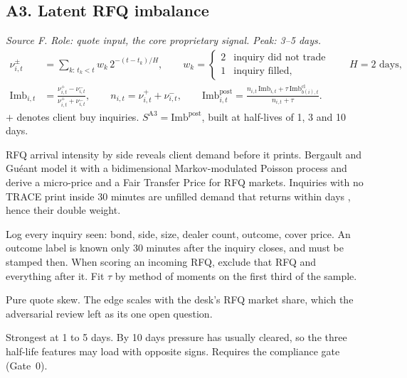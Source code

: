 \documentclass[11pt,letterpaper]{article}
\newcommand{\Imb}{\mathrm{Imb}}
\begin{document}
\subsection{A3. Latent RFQ imbalance}
\emph{Source F. Role: quote input, the core proprietary signal. Peak: 3--5 days.}
\begin{align}
\nu^{\pm}_{i,t} &= \sum_{k:\,t_k<t} w_k\,2^{-(t-t_k)/H},\qquad w_k=\begin{cases}2 & \text{inquiry did not trade}\\ 1 & \text{inquiry filled,}\end{cases}\qquad H=2\text{ days},\\
\Imb_{i,t} &= \frac{\nu^{+}_{i,t}-\nu^{-}_{i,t}}{\nu^{+}_{i,t}+\nu^{-}_{i,t}},\qquad n_{i,t}=\nu^{+}_{i,t}+\nu^{-}_{i,t},\qquad
\Imb^{\mathrm{post}}_{i,t}=\frac{n_{i,t}\,\Imb_{i,t}+\tau\,\Imb^{\mathrm{cl}}_{b(i),t}}{n_{i,t}+\tau}.
\end{align}
$+$ denotes client buy inquiries. $S^{\mathrm{A3}}=\Imb^{\mathrm{post}}$, built at half-lives of 1, 3 and 10 days.
\begin{spec}
\item[Mechanism and evidence.] RFQ arrival intensity by side reveals client demand before it prints. Bergault and Gu\'eant \cite{bg2023} model it with a bidimensional Markov-modulated Poisson process and derive a micro-price and a Fair Transfer Price for RFQ markets. Inquiries with no TRACE print inside 30 minutes are unfilled demand that returns within days \cite{klpw2025}, hence their double weight.
\item[Build.] Log every inquiry seen: bond, side, size, dealer count, outcome, cover price. An outcome label is known only 30 minutes after the inquiry closes, and must be stamped then. When scoring an incoming RFQ, exclude that RFQ and everything after it. Fit $\tau$ by method of moments on the first third of the sample.
\item[Role in the quote.] Pure quote skew. The edge scales with the desk's RFQ market share, which the adversarial review left as its one open question.
\item[Decay and pitfalls.] Strongest at 1 to 5 days. By 10 days pressure has usually cleared, so the three half-life features may load with opposite signs. Requires the compliance gate (Gate~0).
\end{spec}
\end{document}
